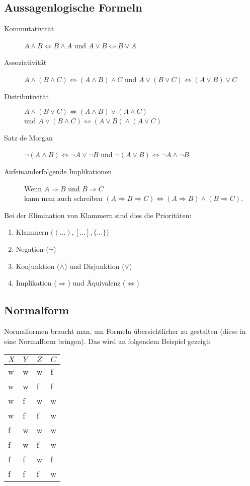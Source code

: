 \subsection{Aussagenlogische Formeln}
\begin{description}
  \item[Kommutativität] $A \wedge B \Leftrightarrow B\wedge A$ und $A \vee B \Leftrightarrow B\vee A$
  \item[Assoziativität] $A \wedge (B \wedge C) \Leftrightarrow (A \wedge B) \wedge C$
    und $A \vee (B \vee C) \Leftrightarrow (A \vee B) \vee C$
  \item[Distributivität] $A \wedge (B \vee C) \Leftrightarrow (A \wedge B) \vee (A \wedge C)$\\
    und $A \vee (B \wedge C) \Leftrightarrow (A \vee B) \wedge (A \vee C)$
  \item[Satz de Morgan] $\neg(A \wedge B) \Leftrightarrow \neg A \vee \neg B$
    und $\neg(A \vee B) \Leftrightarrow \neg A \wedge \neg B$
  \item[Aufeinanderfolgende Implikationen] Wenn $A \Rightarrow B$ und $B \Rightarrow C$ \\ kann man auch schreiben
    $(A \Rightarrow B \Rightarrow C) \Leftrightarrow (A \Rightarrow B) \wedge (B \Rightarrow C)$.
\end{description}
Bei der Elimination von Klammern sind dies die Prioritäten:
\begin{enumerate}
  \item Klammern ($(\dots),[\dots],\{\dots\}$)
  \item Negation ($\neg$)
  \item Konjunktion ($\wedge$) und Disjunktion ($\vee$)
  \item Implikation ($\Rightarrow$) und Äquivalenz ($\Leftrightarrow$)
\end{enumerate}

\subsection{Normalform}
Normalformen braucht man, um Formeln übersichtlicher zu gestalten
(diese in eine Normalform bringen). Das wird an folgendem Beispiel gezeigt:

\begin{tabular}{|l|l|l||l|}
  \hline
  $X$ & $Y$ & $Z$ & $C$ \\
  \hline
  w & w & w & f \\
  w & w & f & f \\
  w & f & w & w \\
  w & f & f & w \\
  f & w & w & w \\
  f & w & f & w \\
  f & f & w & f \\
  f & f & f & w \\
  \hline
\end{tabular}

